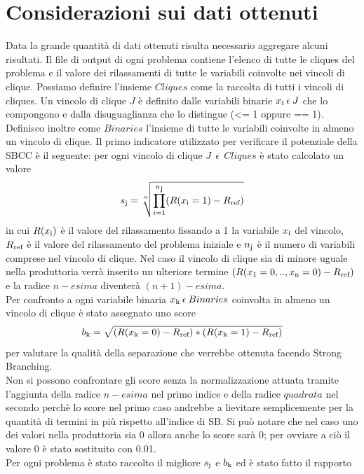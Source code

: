 \documentclass[12pt,a4paper,twoside,openright]{book}
\begin{document}
\section{Considerazioni sui dati ottenuti}
Data la grande quantità di dati ottenuti risulta necessario aggregare alcuni risultati. 
Il file di output di ogni problema contiene l'elenco di tutte le cliques del problema 
e il valore dei rilassamenti di tutte le variabili coinvolte nei vincoli di clique. Possiamo
definire l'insieme $Cliques$ come la raccolta di tutti i vincoli di cliques. Un vincolo di clique
$J$ è definito dalle variabili binarie $x\textsubscript{i}\:\epsilon\:J$ che lo compongono e dalla disuguaglianza che lo distingue (<= 1 oppure == 1). 
Definisco inoltre come $Binaries$ l'insieme di tutte le variabili coinvolte in almeno un vincolo di clique.
Il primo indicatore utilizzato per verificare il potenziale della SBCC è il seguente: per ogni vincolo di clique 
$J\:\:\epsilon\:\:Cliques$ è stato calcolato un valore
\[ s\textsubscript{j} = \sqrt[n]{\prod_{i=1}^{n\textsubscript{j}} (R(x\textsubscript{i}=1)-R\textsubscript{ref}) }\] 
in cui $R(x\textsubscript{i})$ è il valore del rilassamento fissando a 1 la variabile $x\textsubscript{i}$
del vincolo, $R\textsubscript{ref}$ è il valore del rilassamento del problema iniziale e $n\textsubscript{j}$ è il 
numero di variabili comprese nel vincolo di clique. Nel caso il vincolo di clique sia di minore uguale nella 
produttoria verrà inserito un ulteriore termine $(R(x\textsubscript{1}=0, .., x\textsubscript{n}=0)- R\textsubscript{ref})$ e la radice
$n-esima$ diventerà $(n+1)-esima$.\\
Per confronto a ogni variabile binaria $x\textsubscript{k}\:\epsilon\:Binaries$ coinvolta in almeno un vincolo di clique è stato assegnato uno score
\[ b\textsubscript{k} = \sqrt{(R(x\textsubscript{k}=0)-R\textsubscript{ref})*(R(x\textsubscript{k}=1)-R\textsubscript{ref})}\] per 
valutare la qualità della separazione che verrebbe ottenuta facendo Strong Branching.\\
Non si possono confrontare gli score senza la normalizzazione attuata tramite l'aggiunta della radice $n-esima$ nel primo indice
e della radice $quadrata$ nel secondo perchè lo score nel primo caso andrebbe a lievitare semplicemente per la quantità
di termini in più rispetto all'indice di SB. 
Si può notare che nel caso uno dei valori nella produttoria sia 0 allora anche lo score sarà 0; per ovviare a ciò il 
valore 0 è stato sostituito con 0.01.\\
Per ogni problema è stato raccolto il migliore $s\textsubscript{j}$ e $b\textsubscript{k}$ ed è stato fatto il rapporto
\end{document}
